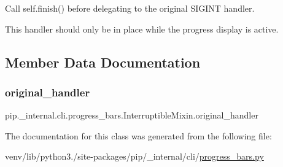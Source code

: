 \begin{DoxyVerb}Call self.finish() before delegating to the original SIGINT handler.

This handler should only be in place while the progress display is
active.
\end{DoxyVerb}
 

\subsection{Member Data Documentation}
\mbox{\label{classpip_1_1__internal_1_1cli_1_1progress__bars_1_1InterruptibleMixin_aeeeaee21bc85a7548923f3b7b81a24f0}} 
\subsubsection{\texorpdfstring{original\+\_\+handler}{original\_handler}}
{\footnotesize\ttfamily pip.\+\_\+internal.\+cli.\+progress\+\_\+bars.\+Interruptible\+Mixin.\+original\+\_\+handler}



The documentation for this class was generated from the following file\+:\begin{DoxyCompactItemize}
\item 
venv/lib/python3./site-\/packages/pip/\+\_\+internal/cli/\hyperlink{progress__bars_8py}{progress\+\_\+bars.\+py}\end{DoxyCompactItemize}

